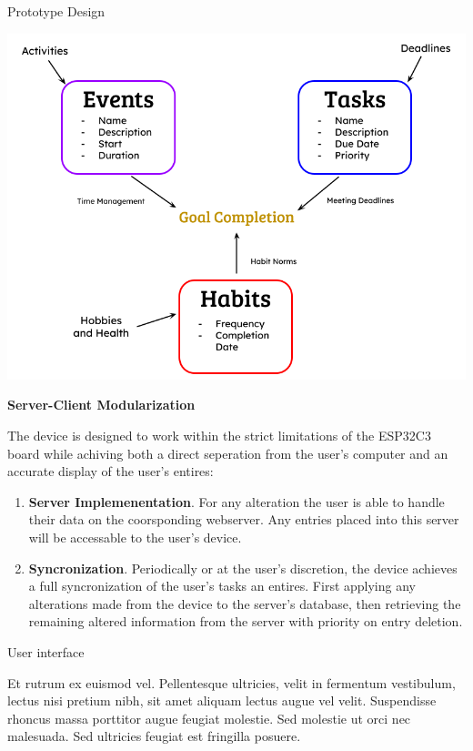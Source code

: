 \documentclass[final]{beamer}
\newlength{\colwidth}
\begin{document}
\begin{frame}[t]
\begin{columns}[t]
\begin{column}{\colwidth}
\begin{block}{Prototype Design}
    \begin{center}
      \includegraphics{entry_logic.png}
    \end{center}

    \textbf{Server-Client Modularization}

    The device is designed to work within the strict limitations of the ESP32C3 board while achiving both a direct seperation from the user's computer and an accurate display of the user's entires:

    \begin{enumerate}
      \item \textbf{Server Implemenentation}. For any alteration the user is able to handle their data on the coorsponding webserver. Any entries placed into this server will be accessable to the user's device.
      \item \textbf{Syncronization}. Periodically or at the user's discretion, the device achieves a full syncronization of the user's tasks an entires. First applying any alterations made from the device to the server's database, then retrieving the remaining altered information from the server with priority on entry deletion.
    \end{enumerate}

    \end{block}

    \begin{block}{User interface}

    Et rutrum ex euismod vel. Pellentesque ultricies, velit in fermentum
    vestibulum, lectus nisi pretium nibh, sit amet aliquam lectus augue vel
    velit. Suspendisse rhoncus massa porttitor augue feugiat molestie. Sed
    molestie ut orci nec malesuada. Sed ultricies feugiat est fringilla
    posuere.


\end{block}
\end{column}
\end{columns}
\end{frame}
\end{document}
